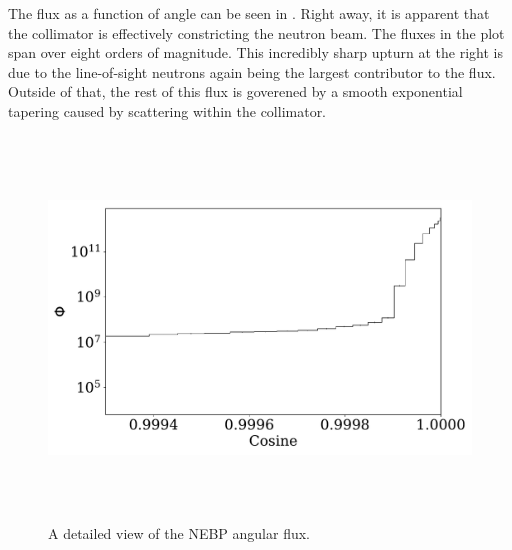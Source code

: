 The flux as a function of angle can be seen in .
Right away, it is apparent that the collimator is effectively constricting the neutron beam.
The fluxes in the plot span over eight orders of magnitude.
This incredibly sharp upturn at the right is due to the line-of-sight neutrons again being the largest contributor to the flux.
Outside of that, the rest of this flux is goverened by a smooth exponential tapering caused by scattering within the collimator.


%
\begin{figure}[htb]
\centering
\includegraphics[height=4in]{tex/figures/flux_cos_detail.pdf}
\caption[Detailed Flux vs. Angle]{A detailed view of the NEBP angular flux.}
\label{fig:flux_cos_detail}
\end{figure}

